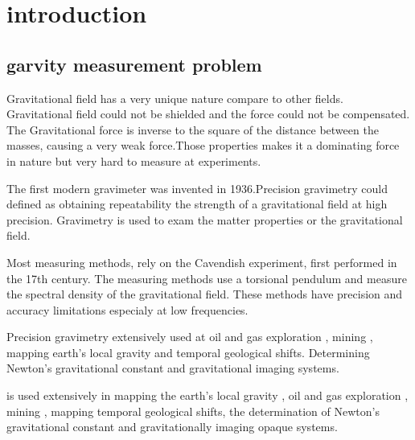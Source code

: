 \documentclass[\main/master.tex]{subfiles}
\begin{document}
\chapter{introduction}\label{chp:example-1}
\section{garvity measurement problem}

Gravitational field has a very unique nature compare to other fields. Gravitational field could not be shielded and the force could not be compensated. The Gravitational force is inverse to the square of the distance between the masses, causing a very weak force.Those properties makes it a dominating force in nature but very hard to measure at experiments.
\par
The first modern gravimeter was invented in 1936.Precision gravimetry could defined as obtaining repeatability the strength of a gravitational field at high precision. Gravimetry is used to exam the matter properties or the gravitational field.
\par 
Most measuring methods, rely on the Cavendish experiment, first performed in the 17th century. The measuring methods use a torsional pendulum and measure the spectral density of the gravitational field. These methods have precision and accuracy limitations especialy at low frequencies.
\par
Precision gravimetry extensively used at oil and gas exploration \cite{Bell98}, mining \cite{Leeuwen00}, mapping earth’s local gravity and temporal geological shifts. Determining Newton’s  gravitational constant and gravitational imaging systems.  


is used extensively in mapping the earth's local gravity \cite{Wahr04,Bingham10}, oil and gas exploration \cite{Bell98}, mining \cite{Leeuwen00}, mapping temporal geological shifts, the determination of Newton's gravitational constant \cite{Luther82, Kuroda95, Karagioz96, Bagley97, Gundlach00, Quinn01, Armstrong03, Kleinevoss99, Parks10, Peters99, Mcguirk02, Dimopoulos07, Lamporesi08, Sorrentino10, Rosi14} and gravitationally imaging opaque systems.


\end{document}

